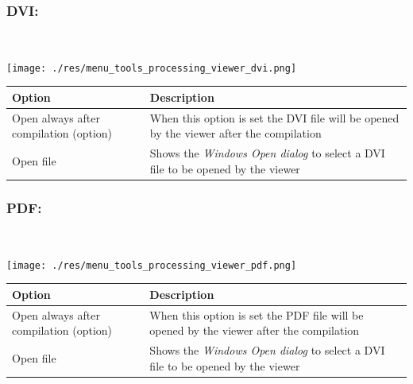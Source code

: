 \hypertarget{menu_tools_processing_viewer_DVI}{}
\subsubsection{DVI:}\\

\texttt{[image: ./res/menu\_tools\_processing\_viewer\_dvi.png]}\\

\begin{scriptsize}
  \begin{tabularx}{\textwidth}{>{\hsize=0.7\hsize}X>{\hsize=0.7\hsize}X}\\
    \hline
    \textbf{Option} & \textbf{Description} \\
    \hline
    Open always after compilation (option) & When this option is set the DVI file will be
     opened by the viewer after the compilation \\
    Open file & Shows the \textit{Windows Open dialog} to select a DVI file to be opened by the viewer \\
    \hline
  \end{tabularx}
\end{scriptsize}


\hypertarget{menu_tools_processing_viewer_pdf}{}
\subsubsection{PDF:}\\

\texttt{[image: ./res/menu\_tools\_processing\_viewer\_pdf.png]}\\

\begin{scriptsize}
  \begin{tabularx}{\textwidth}{>{\hsize=0.7\hsize}X>{\hsize=0.7\hsize}X}\\
    \hline
    \textbf{Option} & \textbf{Description} \\
    \hline
    Open always after compilation (option) & When this option is set the PDF file will be opened
     by the viewer after the compilation \\
    Open file & Shows the \textit{Windows Open dialog} to select a DVI file to be opened by the viewer \\
    \hline
  \end{tabularx}
\end{scriptsize}


